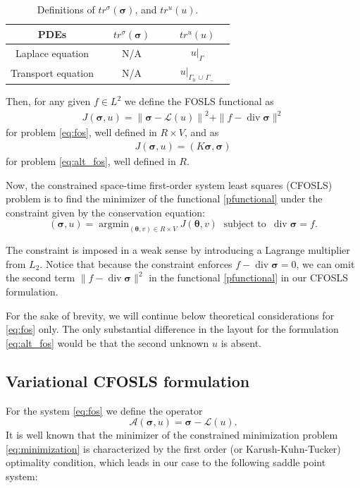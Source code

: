 \documentclass[a4paper,12pt]{amsart}
\numberwithin{equation}{section}
\renewcommand{\div}{\operatorname{div}}
\newcommand{\A}{{\mathcal A}}
\renewcommand{\L}{{\mathcal L}}
\def\btheta{{\boldsymbol \theta}}
\def\bsigma{{\boldsymbol \sigma}}
\DeclareMathOperator*{\argmin}{argmin}
\begin{document}
\begin{table}[h]
\caption{Definitions of $tr^{\sigma}(\bsigma)$, and $tr^u(u)$.}
\label{tab:FOSLS_operators}
\begin{tabular}{ |c||c|c|} \hline
PDEs & $\quad tr^{\sigma}(\bsigma) \quad$ & $\quad tr^u(u) \quad$  \\ \hline
Laplace equation & N/A & $u|_\Gamma$ \\ \hline
Transport equation & N/A & $u|_{\Gamma_0\,\cup\,\Gamma_-}$ \\ \hline
\end{tabular}
\end{table}

Then, for any given $f\in L^2$ we define the FOSLS functional as
\begin{align}
J(\bsigma, u) = \left\| \bsigma - \L(u) \right\|^2 + \| f-\div \bsigma \| ^2 \label{pfunctional}
\end{align} 
for problem \eqref{eq:fos}, well defined in $R \times V$, and as
\begin{align}
J(\bsigma, u) = \left( K \bsigma, \bsigma \right) \label{pfunctional}
\end{align} 
for problem \eqref{eq:alt_fos}, well defined in $R$.

Now, the constrained space-time first-order system least squares (CFOSLS) problem is to find the minimizer of the functional \eqref{pfunctional} 
under the constraint given by the conservation equation:
\begin{equation}
(\bsigma, u) = \argmin_{(\btheta, v)\in R\times V} J(\btheta, v) \;\text{ subject to } \, \div \bsigma = f. 
\label{eq:minimization}
\end{equation}

The constraint is imposed in a weak sense by introducing a Lagrange multiplier from $L_2$. Notice that because the constraint enforces $f-\div \bsigma = 0$, we can omit the second term $\| f-\div \bsigma \| ^2$ in the functional \eqref{pfunctional} in our CFOSLS formulation.

For the sake of brevity, we will continue below theoretical considerations for \eqref{eq:fos} only. The only substantial difference in the layout for the formulation \eqref{eq:alt_fos} would be that the second unknown $u$ is absent.

\subsection{Variational CFOSLS formulation} 
For the system \eqref{eq:fos} we define the operator
\[ 
\A(\bsigma, u ) = \bsigma -\L(u).
\]
It is well known that the minimizer of the constrained minimization problem \eqref{eq:minimization} is characterized by the first order (or Karush-Kuhn-Tucker) optimality condition, which leads in our case to the following saddle point system: 
\end{document}
